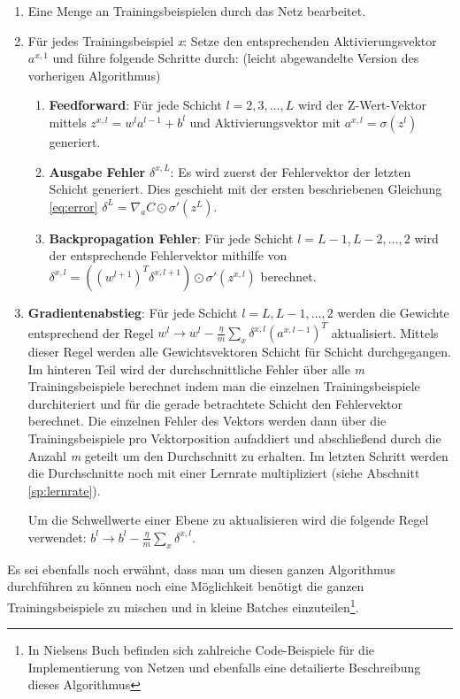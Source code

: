 \begin{minipage}{\linewidth}
\begin{enumerate}

\item Eine Menge an Trainingsbeispielen durch das Netz bearbeitet. 

\item Für jedes Trainingsbeispiel \emph{x}: Setze den entsprechenden Aktivierungsvektor $a^{x,1}$ und führe folgende Schritte durch: (leicht abgewandelte Version des vorherigen Algorithmus)
\begin{enumerate}

	\item \textbf{Feedforward}: Für jede Schicht $l = 2, 3, \ldots, L$ wird der Z-Wert-Vektor mittels $z^{x,l} = w^l a^{l-1}+b^l$ und Aktivierungsvektor mit $a^{x,l} = \sigma(z^{l})$ generiert.
	
	\item \textbf{Ausgabe Fehler} $\delta^{x,L}$: Es wird zuerst der Fehlervektor der letzten Schicht generiert. Dies geschieht mit der ersten beschriebenen Gleichung \ref{eq:error} $\delta^{L}  = \nabla_a C \odot \sigma'(z^L)$. 
	
	\item \textbf{Backpropagation Fehler}: Für jede Schicht $l = L-1, L-2, \ldots, 2$ wird der entsprechende Fehlervektor mithilfe von $\delta^{x,l} = ((w^{l+1})^T \delta^{x,l+1}) \odot \sigma'(z^{x,l})$ berechnet. 
\end{enumerate}

\item \textbf{Gradientenabstieg}: Für jede Schicht $l = L, L-1, \ldots, 2$ werden die Gewichte entsprechend der Regel $w^l \rightarrow w^l-\frac{\eta}{m} \sum_x \delta^{x,l} (a^{x,l-1})^T$ aktualisiert. Mittels dieser Regel werden alle Gewichtsvektoren Schicht für Schicht durchgegangen. Im hinteren Teil wird der durchschnittliche Fehler über alle \emph{m} Trainingsbeispiele berechnet indem man die einzelnen Trainingsbeispiele durchiteriert und für die gerade betrachtete Schicht den Fehlervektor berechnet. Die einzelnen Fehler des Vektors werden dann über die Trainingsbeispiele pro Vektorposition aufaddiert und abschließend durch die Anzahl \emph{m} geteilt um den Durchschnitt zu erhalten. Im letzten Schritt werden die Durchschnitte noch mit einer Lernrate multipliziert (siehe Abschnitt \ref{sp:lernrate}). 

Um die Schwellwerte einer Ebene zu aktualisieren wird die folgende Regel verwendet: $b^l \rightarrow b^l-\frac{\eta}{m} \sum_x \delta^{x,l}$.

\end{enumerate} 
\end{minipage}

\bigbreak

Es sei ebenfalls noch erwähnt, dass man um diesen ganzen Algorithmus durchführen zu können noch eine Möglichkeit benötigt die ganzen Trainingsbeispiele zu mischen und in kleine Batches einzuteilen\footnote{In Nielsens Buch \cite{dlnielsen} befinden sich zahlreiche Code-Beispiele für die Implementierung von Netzen und ebenfalls eine detailierte Beschreibung dieses Algorithmus}. 
